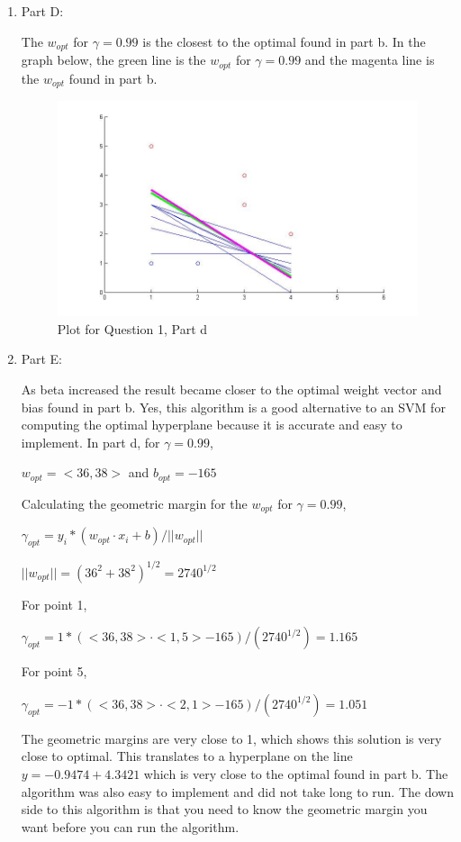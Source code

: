 \documentclass[12pt]{article}
\begin{document}
\begin{enumerate}
\newpage

\item Part D:

The $w_{opt}$ for $\gamma = 0.99$ is the closest to the optimal found in part b. In the graph below, the green line is the $w_{opt}$ for $\gamma = 0.99$ and the magenta line is the $w_{opt}$ found in part b.

\begin{figure}[h!]
  \caption{Plot for Question 1, Part d}
  \centering
    \includegraphics[width=1\textwidth]{hw3_1d2}
\end{figure}




\item Part E:

As beta increased the result became closer to the optimal weight vector and bias found in part b. Yes, this algorithm is a good alternative to an SVM for computing the optimal hyperplane because it is accurate and easy to implement. In part d, for $\gamma = 0.99$,

$w_{opt} = <36,38>$ and $b_{opt} = -165$

Calculating the geometric margin for the $w_{opt}$ for $\gamma = 0.99$,

$\gamma_{opt} = y_i*(w_{opt} \cdot x_i + b)/||w_{opt}||$

$||w_{opt}|| = (36^2+38^2)^{1/2} = 2740^{1/2}$

For point 1,

$\gamma_{opt} = 1*(<36,38> \cdot <1,5> -165)/(2740^{1/2}) = 1.165$

For point 5,

$\gamma_{opt} = -1*(<36,38> \cdot <2,1> -165)/(2740^{1/2}) = 1.051$

The geometric margins are very close to 1, which shows this solution is very close to optimal. This translates to a hyperplane on the line $y= -0.9474 + 4.3421$ which is very close to the optimal found in part b. The algorithm was also easy to implement and did not take long to run. The down side to this algorithm is that you need to know the geometric margin you want before you can run the algorithm.


\end{enumerate}
\end{document}
